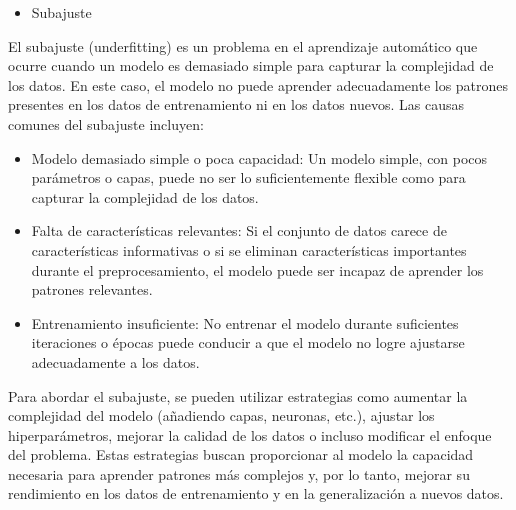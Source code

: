 \begin{itemize}
\item{Subajuste}
\end{itemize}


El subajuste (underfitting) es un problema en el aprendizaje automático que ocurre cuando un modelo es demasiado simple para capturar la complejidad de los datos. En este caso, el modelo no puede aprender adecuadamente los patrones presentes en los datos de entrenamiento ni en los datos nuevos. Las causas comunes del subajuste incluyen:

\begin{itemize}

	\item Modelo demasiado simple o poca capacidad: Un modelo simple, con pocos parámetros o capas, puede no ser lo suficientemente flexible como para capturar la complejidad de los datos.
	
	\item Falta de características relevantes: Si el conjunto de datos carece de características informativas o si se eliminan características importantes durante el preprocesamiento, el modelo puede ser incapaz de aprender los patrones relevantes.
	
	\item Entrenamiento insuficiente: No entrenar el modelo durante suficientes iteraciones o épocas puede conducir a que el modelo no logre ajustarse adecuadamente a los datos.
	
\end{itemize}

Para abordar el subajuste, se pueden utilizar estrategias como aumentar la complejidad del modelo (añadiendo capas, neuronas, etc.), ajustar los hiperparámetros, mejorar la calidad de los datos o incluso modificar el enfoque del problema. Estas estrategias buscan proporcionar al modelo la capacidad necesaria para aprender patrones más complejos y, por lo tanto, mejorar su rendimiento en los datos de entrenamiento y en la generalización a nuevos datos.

	
